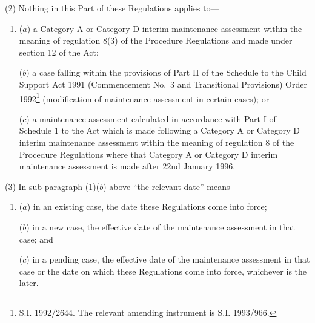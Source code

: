 \documentclass[12pt,a4paper]{article}
\begin{document}
(2) Nothing in this Part of these Regulations applies to—
\begin{enumerate}\item[]
($a$) a Category A 
or Category D  %
interim maintenance assessment within the meaning of 
regulation 8(3)  %
of the Procedure Regulations
and made under section 12 of the Act; 

($b$) a case falling within the provisions of Part II of the Schedule to the Child Support Act 1991 (Commencement No.\ 3 and Transitional Provisions) Order 1992\footnote{\frenchspacing S.I. 1992/2644. The relevant amending instrument is S.I. 1993/966.} (modification of maintenance assessment in certain cases);
or %

($c$) a maintenance assessment calculated in accordance with Part I of Schedule 1 to the Act which is made following a Category A or Category D interim maintenance assessment within the meaning of regulation 8 of the Procedure Regulations where that Category A or Category D interim maintenance assessment is made after 22nd January 1996.
\end{enumerate}

(3) In sub-paragraph (1)($b$) above “the relevant date” means—
\begin{enumerate}\item[]
($a$) in an existing case, the date these Regulations come into force;

($b$) in a new case, the effective date of the maintenance assessment in that case; and

($c$) in a pending case, the effective date of the maintenance assessment in that case or the date on which these Regulations come into force, whichever is the later.
\end{enumerate}

\end{document}
